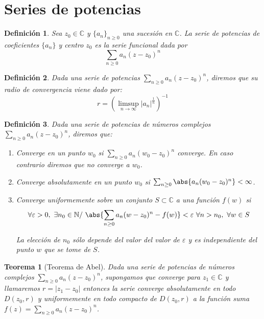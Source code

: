 \documentclass[12pt]{book}
\newtheorem{defi}{Definición}[chapter]
\newtheorem{theorem}{Teorema}[chapter]
\newcommand{\C}{\mathbb{C}}
\newcommand{\N}{\mathbb{N}}
\begin{document}
\section{Series de potencias}

\begin{defi}
Sea $z_0\in \C$ y $\{a_n\}_{n\geq 0}$ una sucesión en $\C$. La serie de potencias de coeficientes $\{a_n\}$ y centro $z_0$ es la serie funcional dada por
$$
\sum_{n\geq 0} a_n(z-z_0)^n
$$ 
\end{defi}

\begin{defi}
Dada una serie de potencias $\sum_{n\geq 0} a_n(z-z_0)^n$, diremos que su radio de convergencia viene dado por:
$$
r = \left(\limsup_{n\to \infty} |a_n|^{\frac{1}{n}}\right)^{-1}
$$
\end{defi}

\begin{defi}
Dada una serie de potencias de números complejos $\sum_{n\geq 0} a_n(z-z_0)^n$, diremos que:

\begin{enumerate}
\item Converge en un punto $w_0$ si $\sum_{n\geq 0} a_n(w_0-z_0)^n$ converge. En caso contrario diremos que no converge a $w_0$.
\item Converge absolutamente en un punto $w_0$ si $\sum_{n\geq 0} \abs{a_n(w_0-z_0)^n}<\infty$.
\item Converge uniformemente sobre un conjunto $S \subset \C$ a una función $f(w)$ si 
$$
\forall\varepsilon>0,\ \exists n_0\in\N /\ \abs{\sum_{n\geq 0} a_n(w-z_0)^n-f(w)}<\varepsilon \ \forall n> n_0,\ \forall w\in S
$$

La elección de $n_0$ sólo depende del valor del valor de $\varepsilon$ y es independiente del punto $w$ que se tome de $S$.
\end{enumerate}
\end{defi}


\begin{theorem}[Teorema de Abel]
Dada una serie de potencias de números complejos  $\sum_{n\geq 0} a_n(z-z_0)^n$, supongamos que converge para $z_1\in\C$ y llamaremos $r = |z_1-z_0|$ entonces la serie converge absolutamente en todo $D(z_0,r)$ y uniformemente en todo compacto de $D(z_0,r)$ a la función suma $f(z) =  \sum_{n\geq 0} a_n(z-z_0)^n$.
\end{theorem}
\end{document}
